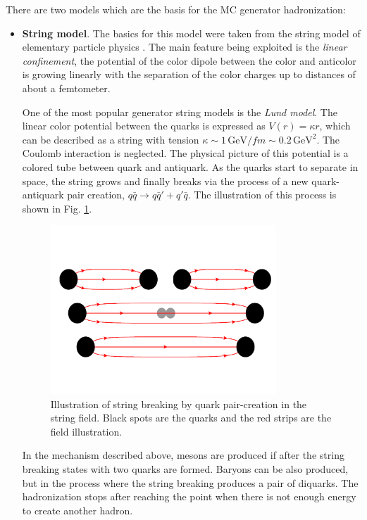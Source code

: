 There are two models which are the basis for the MC generator hadronization:

\begin{itemize}
 \item \textbf{String model}. The basics for this model were taken from the string model of elementary particle physics \cite{Artru:1974hr}.
 The main feature being exploited is the \textit{linear confinement}, the potential of the color dipole 
 between the color and anticolor is growing linearly with the separation of the color charges up to distances of about a femtometer.
 
 One of the most popular generator string models is the \textit{Lund model}\cite{ANDERSSON1987513}. The linear color potential between the quarks is 
 expressed as $V(r) = \kappa r$, which can be described as a string with tension $\kappa \sim 1\,\text{GeV}/fm \sim 0.2\,\text{GeV}^{2}$. 
 The Coulomb interaction is neglected. The physical picture of this potential is a colored tube between quark
 and antiquark. As the quarks start to separate in space, the string grows and finally breaks via the process of a new quark-antiquark
 pair creation, $q\bar{q} \rightarrow q\bar{q}' + q'\bar{q}$. The illustration of this process is shown in Fig. \ref{fig:Lund}. 
 \begin{figure}[h]
  \centering
  \includegraphics[width=0.8\textwidth]{03_simulation/plots/Lund_hadr.pdf}
  \caption{Illustration of string breaking by quark pair-creation in the string field. Black spots are the quarks and the red
  strips are the field illustration.}
  \label{fig:Lund}
 \end{figure} 
%  
 In the mechanism described above, mesons are produced if after the string breaking states with two quarks are formed. 
 Baryons can be also produced, but in the process where the string breaking produces a pair of diquarks.
 The hadronization stops after reaching the point when there is not enough energy to create another hadron.
 

\end{itemize}
